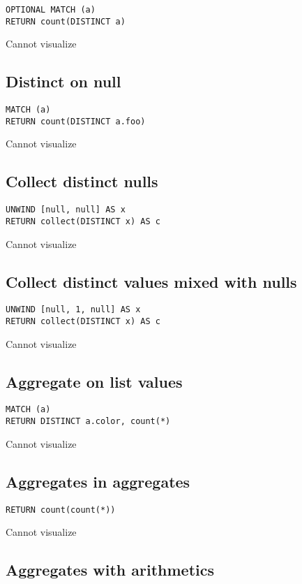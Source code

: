 \begin{lstlisting}
OPTIONAL MATCH (a)
RETURN count(DISTINCT a)
\end{lstlisting}

Cannot visualize
\subsection{Distinct on null}

\begin{lstlisting}
MATCH (a)
RETURN count(DISTINCT a.foo)
\end{lstlisting}

Cannot visualize
\subsection{Collect distinct nulls}

\begin{lstlisting}
UNWIND [null, null] AS x
RETURN collect(DISTINCT x) AS c
\end{lstlisting}

Cannot visualize
\subsection{Collect distinct values mixed with nulls}

\begin{lstlisting}
UNWIND [null, 1, null] AS x
RETURN collect(DISTINCT x) AS c
\end{lstlisting}

Cannot visualize
\subsection{Aggregate on list values}

\begin{lstlisting}
MATCH (a)
RETURN DISTINCT a.color, count(*)
\end{lstlisting}

Cannot visualize
\subsection{Aggregates in aggregates}

\begin{lstlisting}
RETURN count(count(*))
\end{lstlisting}

Cannot visualize
\subsection{Aggregates with arithmetics}

